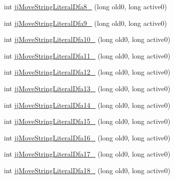 \begin{DoxyCompactItemize}
\item 
int \hyperlink{classorg_1_1coode_1_1owl_1_1krssparser_1_1_k_r_s_s_parser_token_manager_a1de62314907d4cc7141cd64c68774300}{jj\-Move\-String\-Literal\-Dfa8\-\_} (long old0, long active0)
\item 
int \hyperlink{classorg_1_1coode_1_1owl_1_1krssparser_1_1_k_r_s_s_parser_token_manager_a8fe2eafc9751fe4bf37d18b82f2f432f}{jj\-Move\-String\-Literal\-Dfa9\-\_} (long old0, long active0)
\item 
int \hyperlink{classorg_1_1coode_1_1owl_1_1krssparser_1_1_k_r_s_s_parser_token_manager_aa9a4c54059c9b17a94a575b6628cb95f}{jj\-Move\-String\-Literal\-Dfa10\-\_} (long old0, long active0)
\item 
int \hyperlink{classorg_1_1coode_1_1owl_1_1krssparser_1_1_k_r_s_s_parser_token_manager_af8f673f21e98e16b8fbbac93c2146ff7}{jj\-Move\-String\-Literal\-Dfa11\-\_} (long old0, long active0)
\item 
int \hyperlink{classorg_1_1coode_1_1owl_1_1krssparser_1_1_k_r_s_s_parser_token_manager_ac65c3781e311d0f73bcbbaad57bb7206}{jj\-Move\-String\-Literal\-Dfa12\-\_} (long old0, long active0)
\item 
int \hyperlink{classorg_1_1coode_1_1owl_1_1krssparser_1_1_k_r_s_s_parser_token_manager_a269b9d6f8c41140bb22641566ca1c435}{jj\-Move\-String\-Literal\-Dfa13\-\_} (long old0, long active0)
\item 
int \hyperlink{classorg_1_1coode_1_1owl_1_1krssparser_1_1_k_r_s_s_parser_token_manager_a1e50a20b21cdc84b6abed55f8c59cad8}{jj\-Move\-String\-Literal\-Dfa14\-\_} (long old0, long active0)
\item 
int \hyperlink{classorg_1_1coode_1_1owl_1_1krssparser_1_1_k_r_s_s_parser_token_manager_a38a435673851a03cb6356f6f8e0e82a3}{jj\-Move\-String\-Literal\-Dfa15\-\_} (long old0, long active0)
\item 
int \hyperlink{classorg_1_1coode_1_1owl_1_1krssparser_1_1_k_r_s_s_parser_token_manager_a61a4872e4b78215b3c9878616a783ab9}{jj\-Move\-String\-Literal\-Dfa16\-\_} (long old0, long active0)
\item 
int \hyperlink{classorg_1_1coode_1_1owl_1_1krssparser_1_1_k_r_s_s_parser_token_manager_ac452fad2ac4fa2668badb7588720e5f5}{jj\-Move\-String\-Literal\-Dfa17\-\_} (long old0, long active0)
\item 
int \hyperlink{classorg_1_1coode_1_1owl_1_1krssparser_1_1_k_r_s_s_parser_token_manager_a385edf17f9b8dc687aa9520c258d9d26}{jj\-Move\-String\-Literal\-Dfa18\-\_} (long old0, long active0)
\item 

\end{DoxyCompactItemize}
